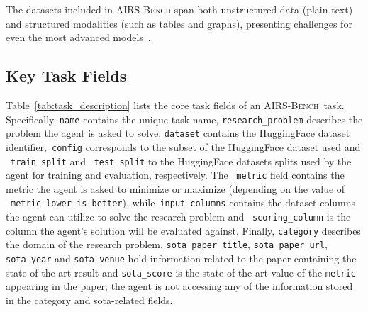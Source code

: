 \documentclass{fairmeta}
\newcommand{\airsbench}{\textsc{AIRS-Bench}}
\begin{document}
The datasets included in \airsbench{} span both unstructured data (plain text) and structured modalities (such as tables and graphs), presenting challenges for even the most advanced models~\citep{fatemi2023talklikegraphencoding, lupidi2025source2synthsyntheticdatageneration}.






\subsection{Key Task Fields}





Table~\ref{tab:task_description} lists the core task fields of an \airsbench~task. Specifically, \texttt{name} contains the unique task name, \texttt{research\_problem} describes the problem the agent is asked to solve, \texttt{dataset} contains the HuggingFace dataset identifier,~\texttt{config} corresponds to the subset of the HuggingFace dataset used and ~\texttt{train\_split} and ~\texttt{test\_split} to the HuggingFace datasets splits used by the agent for training and evaluation, respectively. The ~\texttt{metric} field contains the metric the agent is asked to minimize or maximize (depending on the value of ~\texttt{metric\_lower\_is\_better}), while~\texttt{input\_columns} contains the dataset columns the agent can utilize to solve the research problem and  ~\texttt{scoring\_column} is the column the agent's solution will be evaluated against.
Finally, \texttt{category} describes the domain of the research problem, \texttt{sota\_paper\_title}, \texttt{sota\_paper\_url}, \texttt{sota\_year} and \texttt{sota\_venue} hold information related to the paper containing the state-of-the-art result and \texttt{sota\_score} is the state-of-the-art value of the \texttt{metric} appearing in the paper; the agent is not accessing any of the information stored in the category and sota-related fields. \\
\end{document}
